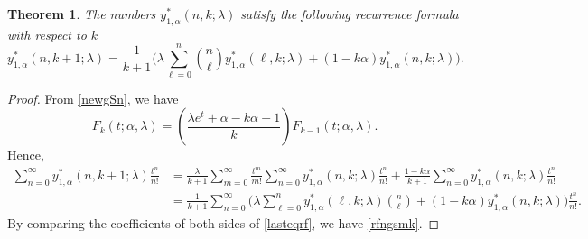 \documentclass{amsart}
\newtheorem{theorem}{Theorem}[section]
\numberwithin{equation}{section}
\theoremstyle{definition}
\theoremstyle{remark}
\begin{document}
\begin{theorem}
The numbers $y_{1,\alpha}^{*}(n,k;\lambda)$ satisfy the following recurrence formula with respect to $k$
\begin{equation}\label{rfngsmk}
 y_{1,\alpha}^{*}(n,k+1;\lambda)=\frac{1}{k+1}\bigg(\lambda\sum_{\ell=0}^{n}\binom{n}{\ell}y_{1,\alpha}^{*}(\ell,k;\lambda)+(1-k\alpha)y_{1,\alpha}^{*}(n,k;\lambda)\bigg).   
\end{equation}
\end{theorem}    
\begin{proof}
From \eqref{newgSn}, we have 
\begin{equation}\label{rel:fkfkmius}
F_{k}(t;\alpha,\lambda)=\left(\frac{\lambda e^t+\alpha-k\alpha+1}{k}\right)F_{k-1}(t;\alpha,\lambda).
\end{equation}
Hence,
\begin{align}
    \sum_{n=0}^{\infty}y_{1,\alpha}^{*}(n,k+1;\lambda)\frac{t^n}{n!}
    &=\frac{\lambda}{k+1}\sum_{m=0}^{\infty}\frac{t^m}{m!}\sum_{n=0}^{\infty}y_{1,\alpha}^{*}(n,k;\lambda)\frac{t^n}{n!}+\frac{1-k\alpha}{k+1}\sum_{n=0}^{\infty}y_{1,\alpha}^{*}(n,k;\lambda)\frac{t^n}{n!}\\
    &=\frac{1}{k+1}\sum_{n=0}^{\infty}\bigg(\lambda\sum_{\ell=0}^{n}y_{1,\alpha}^{*}(\ell,k;\lambda)\binom{n}{\ell}+(1-k\alpha)y_{1,\alpha}^{*}(n,k;\lambda)\bigg)\frac{t^n}{n!}.\label{lasteqrf}
\end{align}
By comparing the coefficients of both sides of \eqref{lasteqrf}, we have \eqref{rfngsmk}.
\end{proof}
\end{document}
